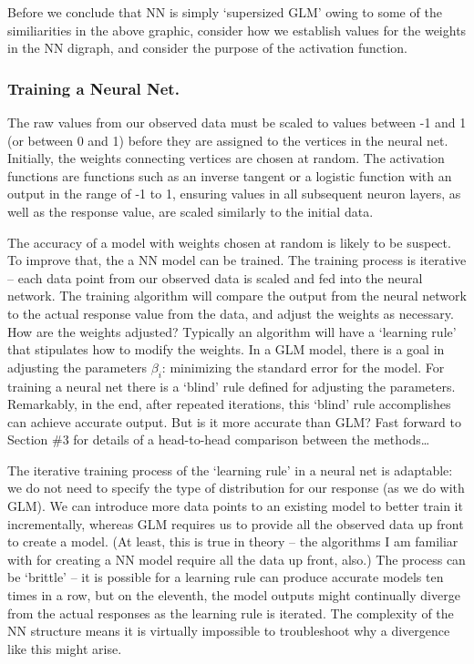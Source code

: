 \documentclass[12pt]{article}
\begin{document}

Before we conclude that NN is simply `supersized GLM' owing to some of the similiarities in the above graphic, consider how we establish values for
the weights in the NN digraph, and consider the purpose of the activation function.

	\subsubsection{Training a Neural Net.}
The raw values from our observed data must be scaled to values between -1 and 1 (or between 0 and 1) before they are assigned to the vertices in 
the neural net.  Initially, the weights connecting vertices are chosen at random.  The activation functions are functions such as an inverse 
tangent or a logistic function with an output in the range of -1 to 1, ensuring values in all subsequent neuron layers, as well as the response 
value, are scaled similarly to the initial data.

The accuracy of a model with weights chosen at random is likely to be suspect.  To improve that, the a NN model can be trained.  The training
process is iterative -- each data point from our observed data is scaled and fed into the neural network.  The training algorithm will compare the
output from the neural network to the actual response value from the data, and adjust the weights as necessary.  How are the weights adjusted?  
Typically an algorithm will have a `learning rule' that stipulates how to modify the weights.  In a GLM model, there is a goal in adjusting the
parameters $\beta_i$: minimizing the standard error for the model.  For training a neural net there is a `blind' rule defined for adjusting the parameters.  Remarkably, in the end, after repeated iterations, this `blind' rule accomplishes can achieve accurate output.  But is it more accurate than GLM?  Fast forward to Section \#3 for details of a head-to-head comparison between the methods\dots

The iterative training process of the `learning rule' in a neural net is adaptable:  we do not need to specify the type of
distribution for our response (as we do with GLM).  We can introduce more data points to an existing model to better train it incrementally,
whereas GLM requires us to provide all the observed data up front to create a model.  (At least, this is true in theory -- the algorithms I am
familiar with for creating a NN model require all the data up front, also.)  The process can be `brittle' -- it is possible for a learning rule can produce accurate
models ten times in a row, but on the eleventh, the model outputs might continually diverge from the actual responses as the learning rule is iterated.  
The complexity of the NN structure means it is virtually impossible to troubleshoot why a divergence like this might arise.
\end{document}
